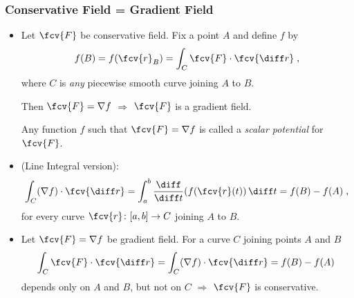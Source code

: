 \begin{frame}
  \frametitle{Conservative Field = Gradient Field}

  \begin{itemize}
    \item Let $\fcv{F}$ be conservative field. \pause Fix a point $A$ and define $f$ by
%
$$f(B)= f(\fcv{r}_B) = \int_C \fcv{F} \cdot \fcv{\diff r} \; ,$$
%
where $C$ is \emph{any} piecewise smooth curve joining $A$ to $B$.

\pause Then $\fcv{F} = \nabla f$ $\Longrightarrow$ $\fcv{F}$ is a gradient field.

Any function $f$ such that $\fcv{F}= \nabla f$ is called a \emph{scalar potential} for~$\fcv{F}$.

\item \pause
{} (Line Integral version):
%
\[
\int_C (\nabla f) \cdot \fcv{\diff r} = \int_a^b \frac{\diff }{\diff t} (f(\fcv{r}(t)) \, \diff t = f(B) - f(A) \; ,
\]
%
for every curve $\fcv{r} \colon [a,b] \to C$ joining $A$ to $B$.

 \item \pause Let $\fcv{F} = \nabla f$ be gradient field. \pause For a curve $C$ joining points $A$ and $B$
\[
\int_C \fcv{F} \cdot \fcv{\diff r} =  \int_C (\nabla f )\cdot \fcv{\diff r}= f(B) - f(A)\;
\]
\pause depends only on $A$ and $B$, but not on $C$ $\Rightarrow$ $\fcv{F}$ is conservative.
  \end{itemize}

\end{frame}